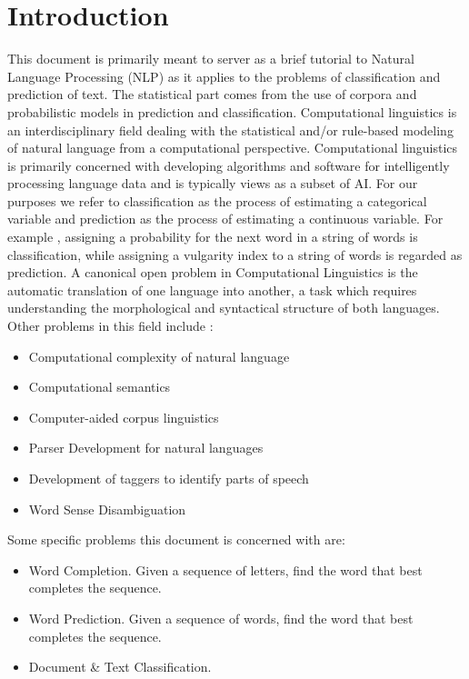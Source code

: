 \section{Introduction}
This document is primarily meant to server as a brief tutorial to Natural Language Processing (NLP) as it applies to the problems of classification and prediction of text.  The statistical part comes from the use of corpora and probabilistic models in prediction and classification.  Computational linguistics is an interdisciplinary field dealing with the statistical and/or rule-based modeling of natural language from a computational perspective.  Computational linguistics is primarily concerned with developing algorithms and software for intelligently processing language data and is typically views as a subset of AI.  For our purposes we refer to classification as the process of estimating a categorical variable and prediction as the process of estimating a continuous variable.  For example , assigning a probability for the next word in a string of words is classification, while assigning a vulgarity index to a string of words is regarded as prediction.  A canonical open problem in Computational Linguistics is the automatic translation of one language into another, a task which requires understanding the morphological and syntactical structure of both languages. Other problems in this field include :
\begin{center}
\begin{itemize}
  \item Computational complexity of natural language
  \item Computational semantics
  \item Computer-aided corpus linguistics
  \item Parser Development for natural languages
  \item Development of taggers to identify parts of speech
  \item Word Sense Disambiguation
\end{itemize}
\end{center}
Some specific problems this document is concerned with are:
\begin{itemize}
  \item Word Completion.  Given a sequence of letters, find the word that best completes the sequence.
  \item Word Prediction. Given a sequence of words, find the word that best completes the sequence.
  \item Document \& Text Classification.
\end{itemize}

